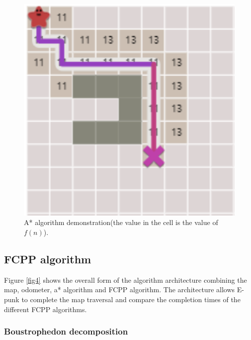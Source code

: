 \documentclass[conference]{IEEEtran}
\begin{document}
\begin{figure}[htbp]
\centerline{\includegraphics[scale=0.45]{RS_Report/astar.png}}
\caption{A* algorithm demonstration(the value in the cell is the value of $f(n)$).}
\label{fig3}
\end{figure}

\subsection{FCPP algorithm}
 Figure \ref{fig4} shows the overall form of the algorithm architecture combining the map, odometer, a* algorithm and FCPP algorithm. The architecture allows E-punk to complete the map traversal and compare the completion times of the different FCPP algorithms.
\subsubsection{Boustrophedon decomposition}
\end{document}
